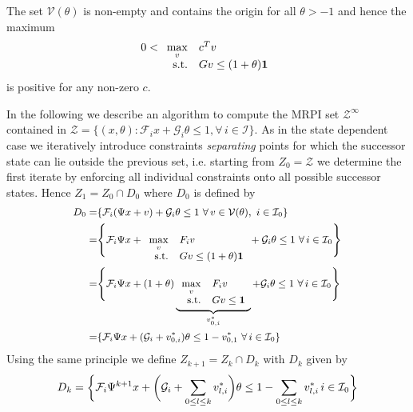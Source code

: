 \begin{rem}
The set $\mathcal V(\theta)$ is non-empty and contains the origin for all $\theta>-1$ and hence the 
maximum
%
\begin{equation*}
0<\begin{array}[t]{rl}
\displaystyle\max_v & c^T v\\
\text{s.t.}& Gv \leq (1+\theta){\bf{1}}
\end{array}
\end{equation*}
%
is positive for any non-zero $c$.
\end{rem}
%
In the following we describe an algorithm to compute the MRPI set $\mathcal Z^\infty$ contained in 
$\mathcal Z = \{(x,\theta):\mathcal F_i x+\mathcal G_i\theta \leq 1,\forall\, i\in\mathcal I\}$.
%
As in the state dependent case we iteratively introduce constraints \emph{separating} points
for which the successor state can lie outside the previous set, i.e. starting from $Z_0 = \mathcal Z$
we determine the first iterate by enforcing all individual constraints onto all possible successor states.
%
Hence $Z_1=Z_0\cap D_0$ where $D_0$ is defined by
%
\begin{equation}\small
\begin{split}
	D_0 =& \{\mathcal F_i(\Psi x+v) + \mathcal G_i\theta \leq 1 \ \forall\, v\in\mathcal V(\theta), \ i\in\mathcal I_0\}\\
	=&\Biggl\{\mathcal F_i\Psi x + \begin{array}[t]{rl}\displaystyle\max_v& F_i v \\ \text{s.t.}& Gv \leq 
	(1+\theta){\bf{1}} \end{array}
	 + \mathcal G_i \theta \leq 1 \ \forall\, i\in\mathcal I_0\Biggr\}\\
	=&\Biggl\{\mathcal F_i\Psi x + (1+\theta)\underbrace{\begin{array}[t]{rl}\displaystyle\max_v& F_i v \\ 
	\text{s.t.}& Gv \leq {\bf{1}}\end{array}}_{v_{0,i}^\ast}
	 + \mathcal G_i \theta \leq 1 \ \forall\, i\in\mathcal I_0\Biggr\}\\
	=&\{\mathcal F_i\Psi x + (\mathcal G_i + v_{0,i}^\ast)\theta \leq 1 - v_{0,1}^\ast \ \forall \, i\in\mathcal I_0
	\}
\end{split}\end{equation}
%
Using the same principle we define $Z_{k+1}=Z_k\cap D_k$ with $D_k$ given by
%
\begin{equation}\label{eq:parametrised:Dk}\small
	D_k = \biggl\{\mathcal F_i\Psi^{k+1}x+ \biggl(\mathcal G_i +\sum_{0\leq l\leq k} v_{l,i}^\ast\biggr)\theta \leq 1 
	- \sum_{0\leq l\leq k} v_{l,i}^\ast\, i\in\mathcal I_0\biggr\}
\end{equation}
